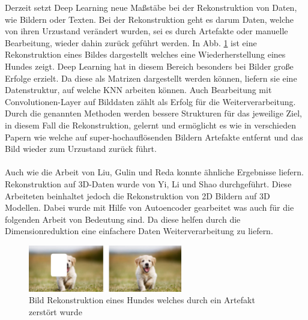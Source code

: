 \documentclass{llncs}
\begin{document}
Derzeit setzt Deep Learning neue Maßstäbe bei der Rekonstruktion von Daten, wie Bildern oder Texten. Bei der Rekonstruktion geht es darum Daten, welche von ihren Urzustand verändert wurden, sei es durch Artefakte oder manuelle Bearbeitung, wieder dahin zurück geführt werden. In Abb. \ref{fig:Bild40} ist eine Rekonstruktion eines Bildes dargestellt welches eine Wiederherstellung eines Hundes zeigt. Deep Learning hat in diesem Bereich besonders bei Bilder große Erfolge erzielt. Da diese als Matrizen dargestellt werden können, liefern sie eine Datenstruktur, auf welche KNN arbeiten können. Auch Bearbeitung mit Convolutionen-Layer auf Bilddaten zählt als Erfolg für die Weiterverarbeitung\cite{imagerecon}. Durch die genannten Methoden werden bessere Strukturen für das jeweilige Ziel, in diesem Fall die Rekonstruktion, gelernt und ermöglicht es wie in verschieden Papern wie \cite{imagere1}  welche auf super-hochauflösenden Bildern Artefakte entfernt und das Bild wieder zum Urzustand zurück führt.
\\\\
Auch wie die Arbeit von Liu, Gulin und Reda \cite{imagere2} konnte ähnliche Ergebnisse liefern. Rekonstruktion auf 3D-Daten wurde von Yi, Li und Shao \cite{3d_recon} durchgeführt. Diese Arbeiteten beinhaltet jedoch die Rekonstruktion von 2D Bildern auf 3D Modellen. Dabei wurde mit Hilfe von Autoencoder gearbeitet was auch für die folgenden Arbeit von Bedeutung sind\cite{3d_recon}. Da diese helfen durch die Dimensionreduktion eine einfachere Daten Weiterverarbeitung zu liefern. 

\begin{figure}[htbp] 
	\centering
	\includegraphics[width=0.6\textwidth]{imagere.png}
	\caption{Bild Rekonstruktion eines Hundes welches durch ein Artefakt zerstört wurde}
	\label{fig:Bild40}
\end{figure}
\newpage
\end{document}
